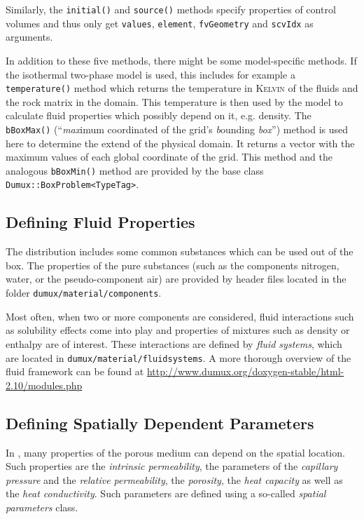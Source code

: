 Similarly, the \texttt{initial()} and \texttt{source()} methods
specify properties of control volumes and thus only get
\texttt{values}, \texttt{element}, \texttt{fvGeometry} and
\texttt{scvIdx} as arguments.

In addition to these five methods, there might be some model-specific
methods. If the isothermal two-phase model is used, this includes for
example a \texttt{temperature()} method which returns the temperature
in \textsc{Kelvin} of the fluids and the rock matrix in the
domain. This temperature is then used by the model to calculate fluid
properties which possibly depend on it, e.g. density. The
\texttt{bBoxMax()} (``\textit{max}imum coordinated of the grid's
\textit{b}ounding \textit{box}'') method is used here to
determine the extend of the physical domain. It returns a vector with the
maximum values of each global coordinate of the grid. This method
and the analogous \texttt{bBoxMin()} method are provided by the base
class \texttt{Dumux::BoxProblem<TypeTag>}.

\subsection{Defining Fluid Properties}
\label{tutorial-implicit:description-fluid-class}
The \Dumux distribution includes some common substances which can be
used out of the box. The properties of the pure substances (such as
the components nitrogen, water, or the pseudo-component air) are
provided by header files located in the folder
\verb+dumux/material/components+.

Most often, when two or more components are considered, fluid
interactions such as solubility effects come into play and properties
of mixtures such as density or enthalpy are of interest. These
interactions are defined by {\em fluid systems}, which are located in
\verb+dumux/material/fluidsystems+. A more thorough overview of the
\Dumux fluid framework can be found 
at \url{http://www.dumux.org/doxygen-stable/html-2.10/modules.php}


\subsection{Defining Spatially Dependent Parameters}
\label{tutorial-implicit:description-spatialParameters}
In \Dumux, many properties of the porous medium can depend on the
spatial location. Such properties are the \textit{intrinsic
  permeability}, the parameters of the \textit{capillary pressure} and
the \textit{relative permeability}, the \textit{porosity}, the
\textit{heat capacity} as well as the \textit{heat conductivity}. Such
parameters are defined using a so-called \textit{spatial parameters}
class.

